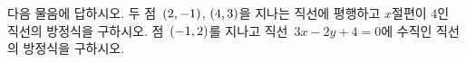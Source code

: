 다음 물음에 답하시오.
 두 점~$(2{,}\mkern3mu\mathopen{}-1)$, $(4{,}\mkern3mu\mathopen{}3)$을 지나는 직선에 평행하고 $x$절편이 $4$인 직선의 방정식을 구하시오.
 점~$(-1{,}\mkern3mu\mathopen{}2)$를 지나고 직선~$3x-2y+4=0$에 수직인 직선의 방정식을 구하시오.
